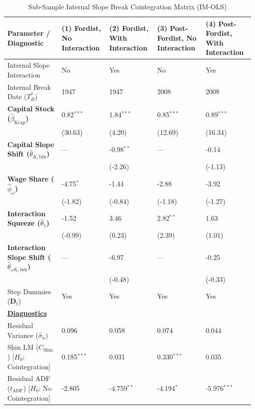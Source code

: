 \documentclass[11pt,a4paper]{article}
\begin{document}
\begin{table}[h!]
\centering
\caption{Sub-Sample Internal Slope Break Cointegration Matrix (IM-OLS)}
\label{tab:specA_table_X}
\small
\begin{tabular}{p{5.5cm}p{2.5cm}p{2.5cm}p{2.5cm}p{2.5cm}}
\toprule
Parameter / Diagnostic & (1) Fordist, No Interaction & (2) Fordist, With Interaction & (3) Post-Fordist, No Interaction & (4) Post-Fordist, With Interaction \\
\midrule
Internal Slope Interaction & No & Yes & No & Yes \\
Internal Break Date ($T_B^*$) & 1947 & 1947 & 2008 & 2008 \\
\midrule
\textbf{Capital Stock ($\hat{\beta}_{\text{Kcap}}$)} & 0.82$^{***}$ & 1.84$^{***}$ & 0.85$^{***}$ & 0.89$^{***}$ \\
 & {\scriptsize (30.63)} & {\scriptsize (4.20)} & {\scriptsize (12.69)} & {\scriptsize (16.34)} \\
\textbf{Capital Slope Shift ($\hat{\theta}_{K, \text{brk}}$)} & --- & -0.98$^{**}$ & --- & -0.14 \\
 & & {\scriptsize (-2.26)} & & {\scriptsize (-1.13)} \\
\textbf{Wage Share ($\hat{\phi}_{\omega}$)} & -4.75$^{*}$ & -1.44 & -2.88 & -3.92 \\
 & {\scriptsize (-1.82)} & {\scriptsize (-0.84)} & {\scriptsize (-1.18)} & {\scriptsize (-1.27)} \\
\textbf{Interaction Squeeze ($\hat{\theta}_1$)} & -1.52 & 3.46 & 2.82$^{**}$ & 1.63 \\
 & {\scriptsize (-0.99)} & {\scriptsize (0.23)} & {\scriptsize (2.39)} & {\scriptsize (1.01)} \\
\textbf{Interaction Slope Shift ($\hat{\theta}_{\omega K, \text{brk}}$)} & --- & -6.97 & --- & -0.25 \\
 & & {\scriptsize (-0.48)} & & {\scriptsize (-0.33)} \\
Step Dummies ($\mathbf{D}_t$) & Yes & Yes & Yes & Yes \\
\midrule
\multicolumn{5}{l}{\underline{\textbf{Diagnostics}}} \\
Residual Variance ($\hat{\sigma}_u$) & 0.096 & 0.058 & 0.074 & 0.044 \\
Shin LM ($C_{\text{Shin}}$) [$H_0$: Cointegration] & 0.185$^{***}$ & 0.031 & 0.330$^{***}$ & 0.035 \\
Residual ADF ($t_{\text{ADF}}$) [$H_0$: No Cointegration] & -2.805 & -4.759$^{**}$ & -4.194$^{*}$ & -5.976$^{***}$ \\

\end{tabular}
\end{table}
\end{document}
